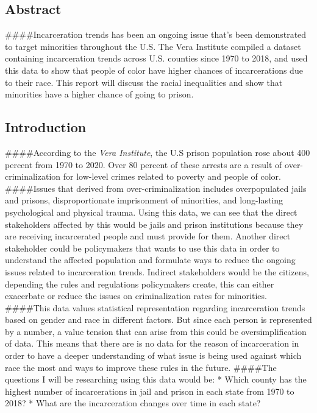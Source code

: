\documentclass[
]{article}
\begin{document}
\hypertarget{abstract}{%
\subsection{Abstract}\label{abstract}}

\#\#\#\#Incarceration trends has been an ongoing issue that's been
demonstrated to target minorities throughout the U.S. The Vera Institute
compiled a dataset containing incarceration trends across U.S. counties
since 1970 to 2018, and used this data to show that people of color have
higher chances of incarcerations due to their race. This report will
discuss the racial inequalities and show that minorities have a higher
chance of going to prison.

\hypertarget{introduction}{%
\subsection{Introduction}\label{introduction}}

\#\#\#\#According to the \emph{Vera Institute}, the U.S prison
population rose about 400 percent from 1970 to 2020. Over 80 percent of
these arrests are a result of over-criminalization for low-level crimes
related to poverty and people of color. \#\#\#\#Issues that derived from
over-criminalization includes overpopulated jails and prisons,
disproportionate imprisonment of minorities, and long-lasting
psychological and physical trauma. Using this data, we can see that the
direct stakeholders affected by this would be jails and prison
institutions because they are receiving incarcerated people and must
provide for them. Another direct stakeholder could be policymakers that
wants to use this data in order to understand the affected population
and formulate ways to reduce the ongoing issues related to incarceration
trends. Indirect stakeholders would be the citizens, depending the rules
and regulations policymakers create, this can either exacerbate or
reduce the issues on criminalization rates for minorities. \#\#\#\#This
data values statistical representation regarding incarceration trends
based on gender and race in different factors. But since each person is
represented by a number, a value tension that can arise from this could
be oversimplification of data. This means that there are is no data for
the reason of incarceration in order to have a deeper understanding of
what issue is being used against which race the most and ways to improve
these rules in the future. \#\#\#\#The questions I will be researching
using this data would be: * Which county has the highest number of
incarcerations in jail and prison in each state from 1970 to 2018? *
What are the incarceration changes over time in each state?
\end{document}
